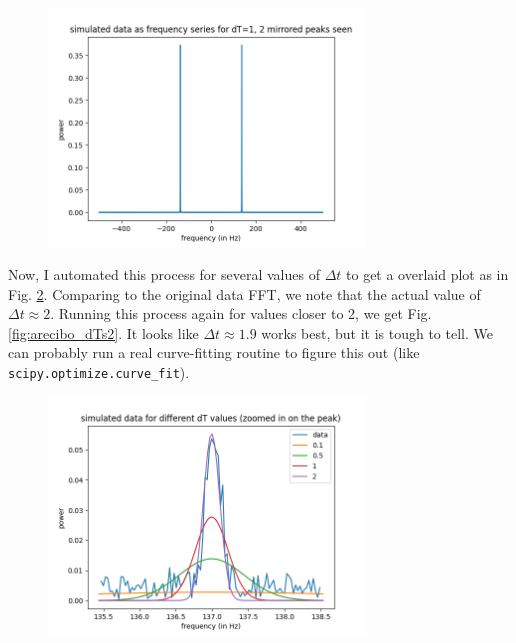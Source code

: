 \documentclass{article}
\begin{document}
\begin{figure}[h!]
\centering
\includegraphics[width=0.75\textwidth]{plots/arecibo_dT1.png}
\caption{\label{fig:arecibo_dT1}  }
\end{figure}

Now, I automated this process for several values of $\Delta t$ to get a overlaid plot as in Fig. \ref{fig:arecibo_dTs}. Comparing to the original data FFT, we note that the actual value of $\Delta t \approx 2$. Running this process again for values closer to 2, we get Fig. \ref{fig:arecibo_dTs2}. It looks like $\Delta t \approx 1.9$ works best, but it is tough to tell. We can probably run a real curve-fitting routine to figure this out (like \texttt{scipy.optimize.curve_fit}).

\begin{figure}[h!]
\centering
\includegraphics[width=0.75\textwidth]{plots/arecibo_dTs.png}
\caption{\label{fig:arecibo_dTs}  }
\end{figure}
\end{document}
